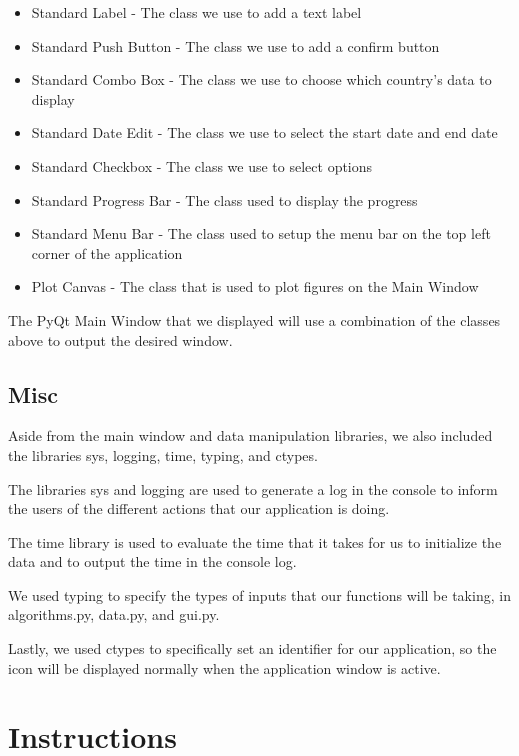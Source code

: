 \documentclass[fontsize=11pt]{article}
\begin{document}
    \begin{itemize}
        \item Standard Label - The class we use to add a text label
        \item Standard Push Button - The class we use to add a confirm button
        \item Standard Combo Box - The class we use to choose which country's data to display
        \item Standard Date Edit - The class we use to select the start date and end date
        \item Standard Checkbox - The class we use to select options
        \item Standard Progress Bar - The class used to display the progress
        \item Standard Menu Bar - The class used to setup the menu bar on the top left corner of the application
        \item Plot Canvas - The class that is used to plot figures on the Main Window
    \end{itemize}

    The PyQt Main Window that we displayed will use a combination of the classes above to output the desired window.

    \subsection{Misc}

    Aside from the main window and data manipulation libraries, we also included the libraries sys, logging, time, typing, and ctypes.

    The libraries sys and logging are used to generate a log in the console to inform the users of the different actions that our application is doing.

    The time library is used to evaluate the time that it takes for us to initialize the data and to output the time in the console log.

    We used typing to specify the types of inputs that our functions will be taking, in algorithms.py, data.py, and gui.py.

    Lastly, we used ctypes to specifically set an identifier for our application, so the icon will be displayed normally when the application window is active.

    \newpage

    \section{Instructions}
\end{document}
